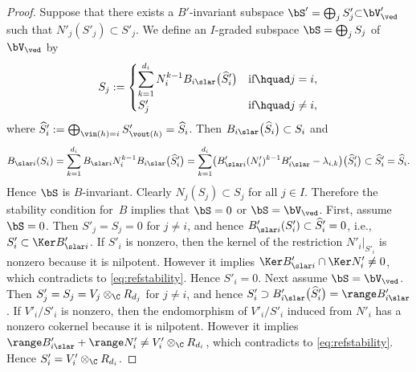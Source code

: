 \begin{proof}
Suppose that there exists a $B'$-invariant subspace
$\bS'=\bigoplus_j S'_j {\subset} \bV'_\ved$ such that
$N'_j(S'_j) {\subset} S'_j$.
We def\/ine an $I$-graded subspace $\bS=\bigoplus_j S_j$ of
$\bV_\ved$ by
\[
S_j := \begin{cases}
\displaystyle \sum\limits_{k=1}^{d_i} N_i^{k-1} B_{i \slar}\bigl( \widehat{S}'_i \bigr)
& \text{if}\hquad j=i,\\
S'_j & \text{if}\hquad j \neq i,
\end{cases}
\]
where $\widehat{S}'_i := \bigoplus_{\vin(h)=i} S'_{\vout(h)} = \widehat{S}_i$.
Then $B_{i \slar}\bigl( \widehat{S}_i \bigr) \subset S_i$ and
\begin{gather*}
B_{\slar i} (S_i)  = \sum_{k=1}^{d_i}
B_{\slar i} N_i^{k-1} B_{i \slar}\bigl( \widehat{S}'_i \bigr)
 =\sum_{k=1}^{d_i}
\bigl( B'_{\slar i} (N'_i)^{k-1} B'_{i \slar} -\lambda_{i,k} \bigr)
\bigl( \widehat{S}'_i \bigr)
 \subset \widehat{S}'_i = \widehat{S}_i.
\end{gather*}
Hence $\bS$ is $B$-invariant.
Clearly $N_j(S_j) \subset S_j$ for all $j \in I$.
Therefore the stability condition for~$B$ implies that
$\bS=0$ or $\bS=\bV_\ved$.
First, assume $\bS=0$.
Then $S'_j=S_j=0$ for $j \neq i$, and hence
$B'_{\slar i}(S'_i) \subset \widehat{S}'_i=0$, i.e.,
$S'_i \subset \Ker B'_{\slar i}$.
If $S'_i$ is nonzero, then the kernel of the restriction
$N'_i |_{S'_i}$ is nonzero because it is nilpotent.
However it implies $\Ker B'_{\slar i} \cap \Ker N'_i \neq 0$,
which contradicts to \eqref{eq:refstability}.
Hence $S'_i=0$.
Next assume $\bS=\bV_\ved$.
Then $S'_j=S_j=V_j \otimes_\C R_{d_j}$ for $j \neq i$, and hence
$S'_i \supset B'_{i \slar}\bigl( \widehat{S}'_i \bigr) = \range B'_{i \slar}$.
If $V'_i/S'_i$ is nonzero,
then the endomorphism of $V'_i/S'_i$ induced from $N'_i$
has a nonzero cokernel because it is nilpotent.
However it implies
$\range B'_{i \slar} + \range N'_i \neq V'_i \otimes_\C R_{d_i}$,
which contradicts to \eqref{eq:refstability}.
Hence $S'_i=V'_i \otimes_\C R_{d_i}$.
\end{proof}



